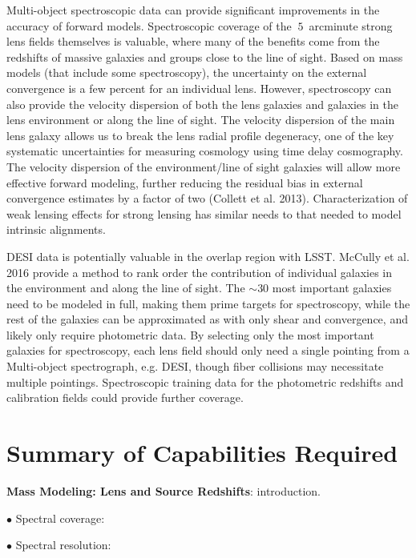 Multi-object spectroscopic data can provide significant improvements in
the accuracy of forward models. Spectroscopic coverage of the
$~5$~arcminute strong lens fields themselves is valuable, where many of
the benefits come from the redshifts of massive galaxies and groups
close to the line of sight. Based on mass models (that include some
spectroscopy), the uncertainty on the external convergence is a few
percent for an individual lens. However, spectroscopy can also provide
the velocity dispersion of both the lens galaxies and galaxies in the
lens environment or along the line of sight. The velocity dispersion of
the main lens galaxy allows us to break the lens radial profile
degeneracy, one of the key systematic uncertainties for measuring
cosmology using time delay cosmography. The velocity dispersion of the
environment/line of sight galaxies will allow more effective forward
modeling, further reducing the residual bias in external convergence
estimates by a factor of two (Collett et al. 2013). Characterization of
weak lensing effects for strong lensing has similar needs to that needed
to model intrinsic alignments.

DESI data is potentially valuable in the overlap region with LSST.
McCully et al. 2016 provide a method to rank order the contribution of
individual galaxies in the environment and along the line of sight. The
$\sim 30$ most important galaxies need to be modeled in full, making
them prime targets for spectroscopy, while the rest of the galaxies can
be approximated as with only shear and convergence, and likely only
require photometric data. By selecting only the most important galaxies
for spectroscopy, each lens field should only need a single pointing
from a Multi-object spectrograph, e.g. DESI, though fiber collisions may
necessitate multiple pointings. Spectroscopic training data for the
photometric redshifts and calibration fields could provide further
coverage.


\section{Summary of Capabilities Required}
\label{sec:sl_summary}

{\bf Mass Modeling: Lens and Source Redshifts}: introduction.

$\bullet$ Spectral coverage:

$\bullet$ Spectral resolution:

